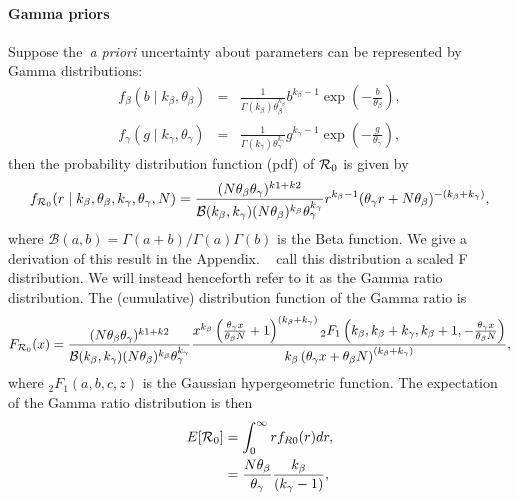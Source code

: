 \documentclass[alpha-refs]{wiley-article}
\newcommand{\rr}{ {\cal R}_0 }						%
\begin{document}
\paragraph{Gamma priors}
Suppose the~\textit{a priori} uncertainty about parameters can be represented by Gamma distributions:
\begin{eqnarray*}
\nonumber
f_{\beta}(b \mid k_{\beta}, \theta_{\beta}) &=& \frac{1}{\Gamma(k_{\beta})\theta_{\beta}^{k_{\beta}}} b^{k_{\beta} - 1} \exp \left(- \frac{b}{\theta_{\beta}} \right), \\
f_{\gamma}(g \mid k_{\gamma}, \theta_{\gamma} ) &=& \frac{1}{\Gamma(k_{\gamma})\theta_{\gamma}^{k_{\gamma}}} g^{k_{\gamma} - 1} \exp \left(- \frac{g}{\theta_{\gamma}} \right),
\end{eqnarray*}
then the probability distribution function (pdf) of $\rr$ is given by
\begin{equation}
\label{eq:density}
f_{\rr}(r \mid k_{\beta}, \theta_{\beta},  k_{\gamma}, \theta_{\gamma}, N ) =  \frac{(N\theta_{\beta}\theta_{\gamma})^{k1+k2}}{\mathcal{B}(k_{\beta}, k_{\gamma})(N\theta_{\beta})^{k_{\beta}}\theta_{\gamma}^{k_{\gamma}} } r^{k_{\beta}-1} (\theta_{\gamma} r + N\theta_{\beta})^{-(k_{\beta} + k_{\gamma})},
\end{equation}
where $\mathcal{B}(a, b) = \Gamma(a + b)/\Gamma(a)\Gamma(b)$ is the Beta function.
We give a derivation of this result in the Appendix.
~\cite{Clancy2008} call this distribution a scaled F distribution.
We will instead  henceforth refer to it as the Gamma ratio distribution.
The (cumulative) distribution function of the Gamma ratio is
\begin{equation}
 \label{eq:cumulative}
 F_{\rr}(x) =  \frac{(N\theta_{\beta}\theta_{\gamma})^{k1+k2}}{\mathcal{B}(k_{\beta}, k_{\gamma})(N\theta_{\beta})^{k_{\beta}}\theta_{\gamma}^{k_{\gamma}} } \frac{ x^{k_{\beta}} \left(\frac{\theta_{\gamma} x}{\theta_{\beta}N } + 1 \right)^{(k_{\beta} + k_{\gamma})}  {}_2 F_1\left(k_{\beta}, k_{\beta} + k_{\gamma}, k_{\beta} + 1, -\frac{ \theta_{\gamma}  x}{ \theta_{\beta} N }  \right) }{ k_{\beta} \left(\theta_{\gamma} x + \theta_{\beta}N \right)^{(k_{\beta} + k_{\gamma})} } ,
\end{equation}
where $ {}_2 F_1 \left(a, b, c, z\right)$ is the Gaussian hypergeometric function.
The expectation of the Gamma ratio distribution is then
\begin{align}
\label{eq:expR0}
\nonumber
E[\rr] &= \int_{0}^{\infty}rf_{R0}(r)dr, \\
       &= \frac{N\theta_{\beta}}{\theta_{\gamma}}\frac{k_{\beta}}{(k_{\gamma}-1)},
\end{align}
\end{document}
